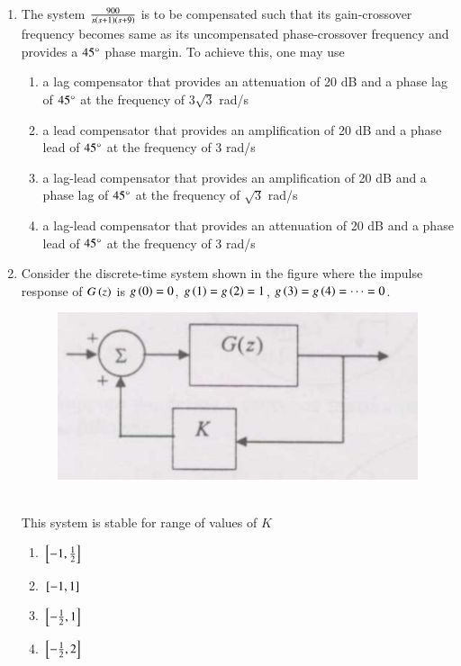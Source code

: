 \documentclass[journal]{IEEEtran}
\begin{document}
\begin{enumerate}
\item The system $\frac{900}{s\left(s+1\right)\left(s+9\right)}$ is to be compensated such that its gain-crossover frequency becomes same as its uncompensated phase-crossover frequency and provides a $45\degree$ phase margin. To achieve this, one may use
    \begin{enumerate}
        \item a lag compensator that provides an attenuation of 20 dB and a phase lag of $45\degree$ at the frequency of $3\sqrt{3}$ rad/s
        \item a lead compensator that provides an amplification of 20 dB and a phase lead of $45\degree$ at the frequency of 3 rad/s
        \item a lag-lead compensator that provides an amplification of 20 dB and a phase lag of $45\degree$ at the frequency of $\sqrt{3}$ rad/s
        \item a lag-lead compensator that provides an attenuation of 20 dB and a phase lead of $45\degree$ at the frequency of 3 rad/s \\
    \end{enumerate}
\item Consider the discrete-time system shown in the figure where the impulse response of $G\left(z\right)$ is $g\left(0\right)=0$, $g\left(1\right)=g\left(2\right)=1$, $g\left(3\right)=g\left(4\right)=\cdots=0$.
\begin{figure}[h!]
	    \centering
	    \includegraphics[width=0.7\linewidth]{figs/Q2.png}
     \end{figure}\\
     This system is stable for range of values of $K$
\begin{enumerate}
    \item ${}\left[-1, \frac{1}{2}\right]$
    \item ${}\left[-1, 1\right]$
    \item ${}\left[-\frac{1}{2}, 1\right]$
    \item ${}\left[-\frac{1}{2}, 2\right]$ \\
\end{enumerate}

\end{enumerate}
\end{document}
